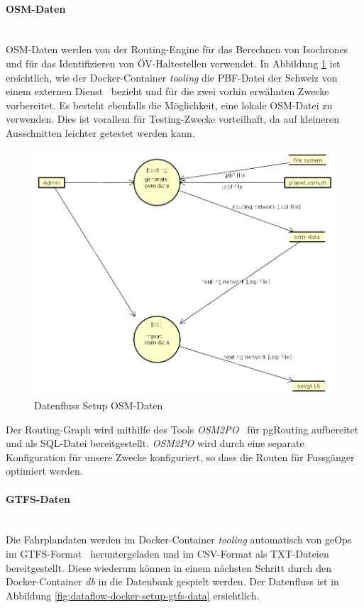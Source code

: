 \paragraph{OSM-Daten}~\\
\acs{OSM}-Daten werden von der Routing-Engine für das Berechnen von \glspl{Isochrone} und für das Identifizieren von \acs{ÖV}-Haltestellen verwendet.
In Abbildung \ref{fig:dataflow-docker-setup-osm-data} ist ersichtlich, wie der Docker-Container \emph{tooling} die \acs{PBF}-Datei der Schweiz von einem externen Dienst~\cite{planet_osm_ch} bezieht und für die zwei vorhin erwähnten Zwecke vorbereitet.
Es besteht ebenfalls die Möglichkeit, eine lokale \acs{OSM}-Datei zu verwenden.
Dies ist vorallem für Testing-Zwecke vorteilhaft, da auf kleineren Ausschnitten leichter getestet werden kann.

\begin{figure}[ht]
    \centering
    \includegraphics[width=0.8\linewidth]{projectdoc/img/dataflow-docker-setup-osm-data.png}
    \caption[Datenfluss Setup OSM-Daten]{Datenfluss Setup OSM-Daten}
    \label{fig:dataflow-docker-setup-osm-data}
\end{figure}

Der Routing-Graph wird mithilfe des Tools \emph{OSM2PO}~\cite{OSM2PO} für pgRouting aufbereitet und als SQL-Datei bereitgestellt.
\emph{OSM2PO} wird durch eine separate Konfiguration für unsere Zwecke konfiguriert, so dass die Routen für Fussgänger optimiert werden.

\paragraph{GTFS-Daten}~\\
Die Fahrplandaten werden im Docker-Container \emph{tooling} automatisch von geOps~\cite{geops_fahrplandaten} im GTFS-Format~\cite{gtfs_spec} heruntergeladen und im CSV-Format als TXT-Dateien bereitgestellt.
Diese wiederum können in einem nächsten Schritt durch den Docker-Container \emph{db} in die Datenbank gespielt werden.
Der Datenfluss ist in Abbildung \ref{fig:dataflow-docker-setup-gtfs-data} ersichtlich.

